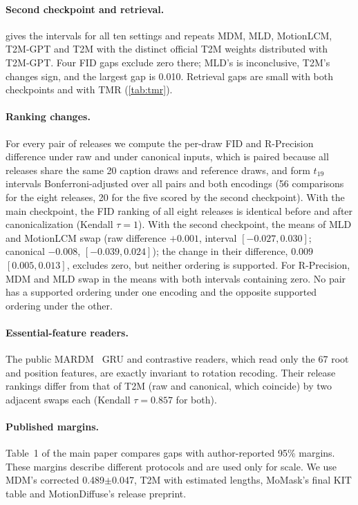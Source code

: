 \documentclass[10pt,twocolumn,letterpaper]{article}
\begin{document}
\paragraph{Second checkpoint and retrieval.}  gives the intervals for all ten settings and repeats MDM, MLD, MotionLCM, T2M-GPT and T2M with the distinct official T2M weights distributed with T2M-GPT. Four FID gaps exclude zero there; MLD's is inconclusive, T2M's changes sign, and the largest gap is 0.010. Retrieval gaps are small with both checkpoints and with TMR (\cref{tab:tmr}).





\paragraph{Ranking changes.} For every pair of releases we compute the per-draw FID and R-Precision difference under raw and under canonical inputs, which is paired because all releases share the same 20 caption draws and reference draws, and form $t_{19}$ intervals Bonferroni-adjusted over all pairs and both encodings (56 comparisons for the eight releases, 20 for the five scored by the second checkpoint). With the main checkpoint, the FID ranking of all eight releases is identical before and after canonicalization (Kendall $\tau=1$). With the second checkpoint, the means of MLD and MotionLCM swap (raw difference $+0.001$, interval $[-0.027, 0.030]$; canonical $-0.008$, $[-0.039, 0.024]$); the change in their difference, $0.009$ $[0.005, 0.013]$, excludes zero, but neither ordering is supported. For R-Precision, MDM and MLD swap in the means with both intervals containing zero. No pair has a supported ordering under one encoding and the opposite supported ordering under the other.

\paragraph{Essential-feature readers.} The public MARDM~\cite{mardm2025} GRU and contrastive readers, which read only the 67 root and position features, are exactly invariant to rotation recoding. Their release rankings differ from that of T2M (raw and canonical, which coincide) by two adjacent swaps each (Kendall $\tau=0.857$ for both).

\paragraph{Published margins.} Table~1 of the main paper compares gaps with author-reported 95\% margins. These margins describe different protocols and are used only for scale. We use MDM's corrected 0.489$\pm$0.047, T2M with estimated lengths, MoMask's final KIT table and MotionDiffuse's release preprint.
\end{document}
